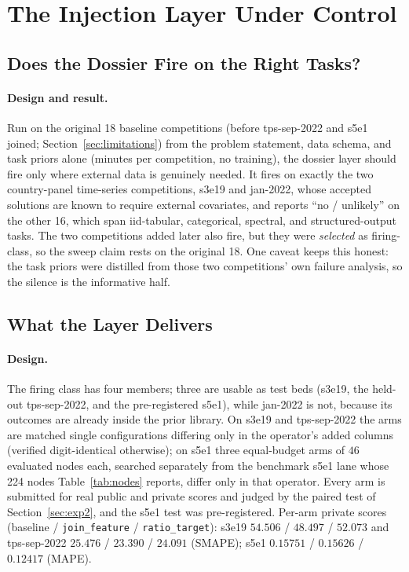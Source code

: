 \documentclass[11pt,a4paper]{article}
\begin{document}
\section{The Injection Layer Under Control}

\subsection{Does the Dossier Fire on the Right Tasks?}
\label{sec:exp5v5}

\paragraph{Design and result.} Run on the original 18 baseline competitions (before tps-sep-2022 and s5e1 joined; Section~\ref{sec:limitations}) from the problem statement, data schema, and task priors alone (minutes per competition, no training), the dossier layer should fire only where external data is genuinely needed. It fires on exactly the two country-panel time-series competitions, s3e19 and jan-2022, whose accepted solutions are known to require external covariates, and reports ``no / unlikely'' on the other 16, which span iid-tabular, categorical, spectral, and structured-output tasks. The two competitions added later also fire, but they were \emph{selected} as firing-class, so the sweep claim rests on the original 18. One caveat keeps this honest: the task priors were distilled from those two competitions' own failure analysis, so the silence is the informative half.

\subsection{What the Layer Delivers}
\label{sec:exp6v5}

\paragraph{Design.} The firing class has four members; three are usable as test beds (s3e19, the held-out tps-sep-2022, and the pre-registered s5e1), while jan-2022 is not, because its outcomes are already inside the prior library. On s3e19 and tps-sep-2022 the arms are matched single configurations differing only in the operator's added columns (verified digit-identical otherwise); on s5e1 three equal-budget arms of $46$ evaluated nodes each, searched separately from the benchmark s5e1 lane whose 224 nodes Table~\ref{tab:nodes} reports, differ only in that operator. Every arm is submitted for real public and private scores and judged by the paired test of Section~\ref{sec:exp2}, and the s5e1 test was pre-registered. Per-arm private scores (baseline / \texttt{join\_feature} / \texttt{ratio\_target}): s3e19 $54.506$ / $48.497$ / $52.073$ and tps-sep-2022 $25.476$ / $23.390$ / $24.091$ (SMAPE); s5e1 $0.15751$ / $0.15626$ / $0.12417$ (MAPE).
\end{document}
